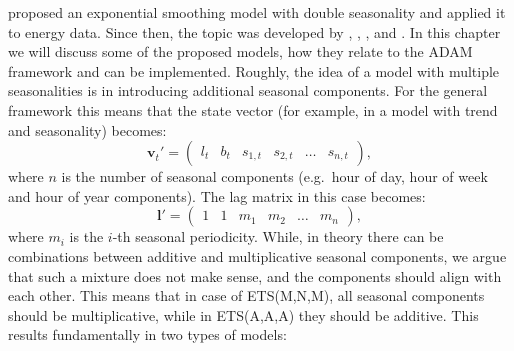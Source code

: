 \documentclass[
]{book}
\theoremstyle{definition}
\theoremstyle{definition}
\theoremstyle{definition}
\theoremstyle{definition}
\theoremstyle{remark}
\begin{document}
\citet{Taylor2003} proposed an exponential smoothing model with double seasonality and applied it to energy data. Since then, the topic was developed by \citet{Gould2008}, \citet{Taylor2008}, \citet{Taylor2010}, \citet{DeLivera2010} and \citet{DeLivera2011}. In this chapter we will discuss some of the proposed models, how they relate to the ADAM framework and can be implemented. Roughly, the idea of a model with multiple seasonalities is in introducing additional seasonal components. For the general framework this means that the state vector (for example, in a model with trend and seasonality) becomes:
\begin{equation}
  \mathbf{v}_t' =
    \begin{pmatrix}
    l_t & b_t & s_{1,t} & s_{2,t} & \dots & s_{n,t}
    \end{pmatrix},
  \label{eq:ETSADAMSeasonalMultiStateVector}
\end{equation}
where \(n\) is the number of seasonal components (e.g.~hour of day, hour of week and hour of year components). The lag matrix in this case becomes:
\begin{equation}
  \boldsymbol{l}'=\begin{pmatrix}1 & 1 & m_1 & m_2 & \dots & m_n \end{pmatrix},
  \label{eq:ETSADAMSeasonalMultiStateVectorLags}
\end{equation}
where \(m_i\) is the \(i\)-th seasonal periodicity. While, in theory there can be combinations between additive and multiplicative seasonal components, we argue that such a mixture does not make sense, and the components should align with each other. This means that in case of ETS(M,N,M), all seasonal components should be multiplicative, while in ETS(A,A,A) they should be additive. This results fundamentally in two types of models:
\end{document}
